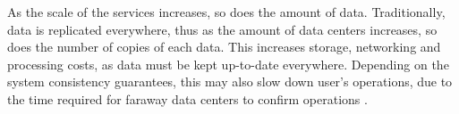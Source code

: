 As the scale of the services increases, so does the amount of data.
Traditionally, data is replicated everywhere, thus as the amount of data centers increases, so does the number of copies of each data.
This increases storage, networking and processing costs, as data must be kept up-to-date everywhere.
Depending on the system consistency guarantees, this may also slow down user's operations, 
due to the time required for faraway data centers to confirm operations \cite{hildred2023caerus}.




